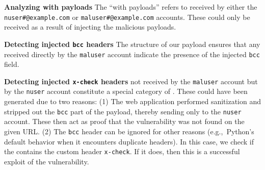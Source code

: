 \noindent\textbf{Analyzing \email with payloads}
The ``\emails with payloads'' refers to \emails received by either the {\lstinline{nuser#@example.com}} or {\lstinline{maluser#@example.com}} accounts. These \emails could only be received as a result of injecting the malicious payloads.

\noindent\textbf{Detecting injected \texttt{bcc} headers}
The structure of our payload ensures that any \emails received directly by the \lstinline{maluser} account indicate the presence of the injected \lstinline{bcc} field.

\label{analyze:detect_x_check}
\noindent\textbf{Detecting injected \texttt{x-check} headers} \Emails
not received by the \lstinline{maluser} account but by the \lstinline{nuser}
account constitute a special category of \emails. These \emails could
have been generated due to two reasons: (1) The web application
performed sanitization and stripped out the \lstinline{bcc}
part of the payload, thereby sending \emails only to the
\lstinline{nuser} account. These \emails then act as proof that the
vulnerability was not found on the given URL. (2) The \lstinline{bcc}
header can be ignored for other reasons (e.g.,\ Python's default
behavior when it encounters duplicate headers). In this case, we check
if the \email contains the custom header \lstinline{x-check}. If it does,
then this is a successful exploit of the vulnerability.
